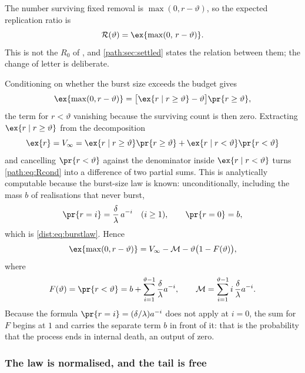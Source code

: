 The number surviving fixed removal is $\max(0,r-\vartheta)$, so the expected
replication ratio is
\begin{equation}
\mathcal{R}(\vartheta) = \ex{\max(0,\,r-\vartheta)}.
\label{path:eq:Rdef}
\end{equation}
This is not the $R_0$ of \ChPop{}, and \cref{path:sec:settled} states the
relation between them; the change of letter is deliberate.

Conditioning on whether the burst size exceeds the budget gives
\begin{equation}
\ex{\max(0,r-\vartheta)}
= \bigl[\ex{r\mid r\ge\vartheta}-\vartheta\bigr]\pr{r\ge\vartheta},
\label{path:eq:Rcond}
\end{equation}
the term for $r<\vartheta$ vanishing because the surviving count is then
zero. Extracting $\ex{r\mid r\ge\vartheta}$ from the decomposition
\[
\ex{r}=V_\infty
= \ex{r\mid r\ge\vartheta}\pr{r\ge\vartheta}
+ \ex{r\mid r<\vartheta}\pr{r<\vartheta}
\]
and cancelling $\pr{r<\vartheta}$ against the denominator inside
$\ex{r\mid r<\vartheta}$ turns \cref{path:eq:Rcond} into a difference of two
partial sums. This is analytically computable because the burst-size law is
known: unconditionally, including the mass $b$ of realisations that never
burst,
\begin{equation}
\pr{r=i}=\frac{\delta}{\lambda}\,a^{-i}\quad (i\ge1),
\qquad
\pr{r=0}=b,
\label{path:eq:burstlaw}
\end{equation}
which is \cref{dist:eq:burstlaw}. Hence
\begin{equation}
\ex{\max(0,r-\vartheta)}
= V_\infty-\mathcal{M}-\vartheta\bigl(1-F(\vartheta)\bigr),
\label{path:eq:Rpartial}
\end{equation}
where
\begin{equation}
F(\vartheta)=\pr{r<\vartheta}=b+\sum_{i=1}^{\vartheta-1}\frac{\delta}{\lambda}a^{-i},
\qquad
\mathcal{M}=\sum_{i=1}^{\vartheta-1} i\,\frac{\delta}{\lambda}a^{-i}.
\label{path:eq:FM}
\end{equation}
Because the formula $\pr{r=i}=(\delta/\lambda)a^{-i}$ does not apply at
$i=0$, the sum for $F$ begins at $1$ and carries the separate term $b$ in
front of it: that is the probability that the process ends in internal
death, an output of zero.

\subsubsection{The law is normalised, and the tail is free}
\label{path:sec:normalisation}

